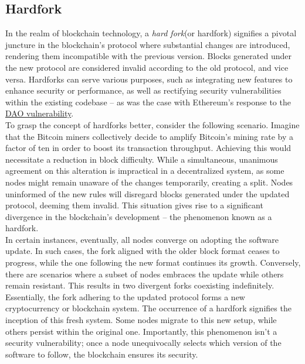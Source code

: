 \subsection{Hardfork}
In the realm of blockchain technology, a \textit{hard fork}(or hardfork) signifies a pivotal juncture in the blockchain's protocol where substantial changes are introduced, rendering them incompatible with the previous version. Blocks generated under the new protocol are considered invalid according to the old protocol, and vice versa. Hardforks can serve various purposes, such as integrating new features to enhance security or performance, as well as rectifying security vulnerabilities within the existing codebase – as was the case with Ethereum's response to the \href{https://en.wikipedia.org/wiki/The_DAO_(organization)}{DAO vulnerability}.\\
To grasp the concept of hardforks better, consider the following scenario. Imagine that the Bitcoin miners collectively decide to amplify Bitcoin's mining rate by a factor of ten in order to boost its transaction throughput. Achieving this would necessitate a reduction in block difficulty. While a simultaneous, unanimous agreement on this alteration is impractical in a decentralized system, as some nodes might remain unaware of the changes temporarily, creating a split. Nodes uninformed of the new rules will disregard blocks generated under the updated protocol, deeming them invalid. This situation gives rise to a significant divergence in the blockchain's development – the phenomenon known as a hardfork.\\
In certain instances, eventually, all nodes converge on adopting the software update. In such cases, the fork aligned with the older block format ceases to progress, while the one following the new format continues its growth. Conversely, there are scenarios where a subset of nodes embraces the update while others remain resistant. This results in two divergent forks coexisting indefinitely. Essentially, the fork adhering to the updated protocol forms a new cryptocurrency or blockchain system. The occurrence of a hardfork signifies the inception of this fresh system. Some nodes migrate to this new setup, while others persist within the original one. Importantly, this phenomenon isn't a security vulnerability; once a node unequivocally selects which version of the software to follow, the blockchain ensures its security.\\

